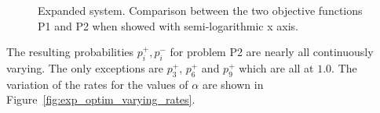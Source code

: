 			\begin{figure}[h!]
				\begin{center}
				\end{center}
				\caption{Expanded system. Comparison between the two objective functions P1 and P2 when showed with semi-logarithmic x axis.}
			\label{fig:exp_optim_objfct_comparison} %
			\end{figure}
		
		The resulting probabilities $p_i^+, p_i^-$ for problem P2 are nearly all continuously varying. The only exceptions are $p_3^+$, $p_6^+$ and $p_9^+$ which are all at $1.0$. The variation of the rates for the values of $\alpha$ are shown in Figure~\ref{fig:exp_optim_varying_rates}.
		
